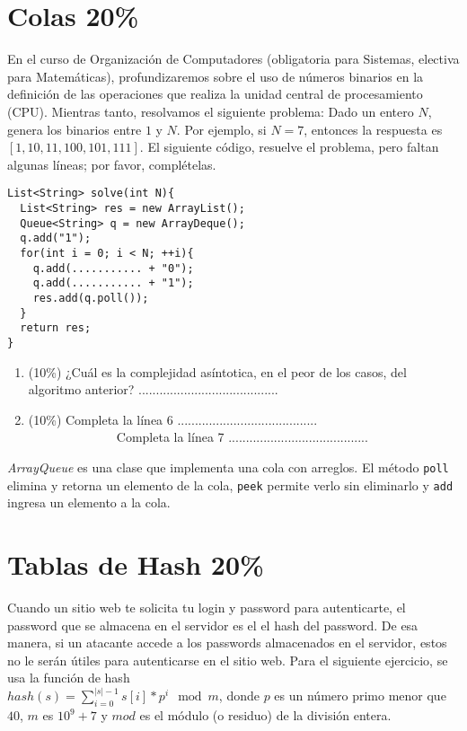 \documentclass[10 pt]{article}
\begin{document}
\begin{multicols}{2}
\section{Colas 20\%}
En el curso de Organización de Computadores (obligatoria para Sistemas, electiva para Matemáticas), profundizaremos sobre el uso de números binarios en la definición de las operaciones que realiza la unidad central de procesamiento (CPU). Mientras tanto, resolvamos el siguiente problema: 
Dado un entero $N$, genera los binarios entre $1$ y $N$. Por ejemplo, si $N = 7$, entonces la respuesta es $[1, 10, 11, 100, 101, 111]$. El siguiente código, resuelve el problema, pero faltan algunas líneas; por favor, complételas.
{\small
\begin{lstlisting}
List<String> solve(int N){
  List<String> res = new ArrayList();
  Queue<String> q = new ArrayDeque();
  q.add("1");
  for(int i = 0; i < N; ++i){
    q.add(........... + "0");
    q.add(........... + "1");
    res.add(q.poll());
  }
  return res;
}
\end{lstlisting}
}
\begin{enumerate}[label=\Alph*]
	\item (10\%) ¿Cuál es la complejidad asíntotica, en el peor de los casos, del algoritmo anterior? ........................................
	\item (10\%) Completa la línea 6 ........................................
  \ \ \ \ \ \ \ \ \ \ \ \ \ \ Completa la línea 7 ........................................
\end{enumerate}

\emph{ArrayQueue} es una clase que implementa una cola con arreglos. El método \texttt{poll} elimina y retorna un elemento de la cola, \texttt{peek} permite verlo sin eliminarlo y \texttt{add} ingresa un elemento a la cola.

\section{Tablas de Hash 20\%}
Cuando un sitio web te solicita tu login y password para autenticarte, el password que se almacena en el servidor es el el hash del password. De esa manera, si un atacante accede a los passwords almacenados en el servidor, estos no le serán útiles para autenticarse en el sitio web. 
Para el siguiente ejercicio, se usa la función de hash \\$hash(s) = \sum\limits_{i = 0}^{|s| - 1} s[i] * p^i \mod m$, donde $p$ es un número primo menor que $40$,  $m$ es $10^9 + 7$ y $mod$ es el módulo (o residuo) de la división entera. 


\end{multicols}
\end{document}
